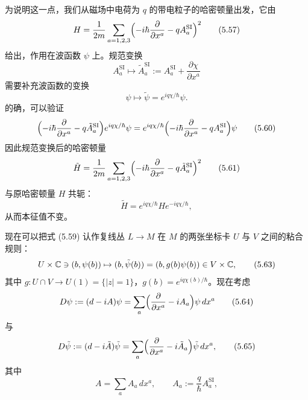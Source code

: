 为说明这一点，我们从磁场中电荷为 $q$ 的带电粒子的哈密顿量出发，它由
\begin{equation}
  H=\frac{1}{2m}\sum_{a=1,2,3}\Bigl(-i\hbar\frac{\partial}{\partial x^a}-qA^{\mathrm{SI}}_a\Bigr)^2
  \tag{5.57}
\end{equation}
给出，作用在波函数 $\psi$ 上。规范变换
\begin{equation}
  A^{\mathrm{SI}}_a\mapsto\tilde A^{\mathrm{SI}}_a:=A^{\mathrm{SI}}_a+\frac{\partial\chi}{\partial x^a}
  \tag{5.58}
\end{equation}
需要补充波函数的变换
\begin{equation}
  \psi\mapsto\tilde\psi=e^{iq\chi/\hbar}\psi.
  \tag{5.59}
\end{equation}
的确，可以验证
\begin{equation}
  \Bigl(-i\hbar\frac{\partial}{\partial x^a}-q\tilde A^{\mathrm{SI}}_a\Bigr)e^{iq\chi/\hbar}\psi
  =e^{iq\chi/\hbar}\Bigl(-i\hbar\frac{\partial}{\partial x^a}-qA^{\mathrm{SI}}_a\Bigr)\psi
  \tag{5.60}
\end{equation}
因此规范变换后的哈密顿量
\begin{equation}
  \tilde H=\frac{1}{2m}\sum_{a=1,2,3}\Bigl(-i\hbar\frac{\partial}{\partial x^a}-q\tilde A^{\mathrm{SI}}_a\Bigr)^2
  \tag{5.61}
\end{equation}
与原哈密顿量 $H$ 共轭：
\begin{equation}
  \tilde H=e^{iq\chi/\hbar}He^{-iq\chi/\hbar},
  \tag{5.62}
\end{equation}
从而本征值不变。

现在可以把式 (5.59) 认作复线丛 $L\to M$ 在 $M$ 的两张坐标卡 $U$ 与 $V$ 之间的粘合规则：
\begin{equation}
  U\times\mathbb{C}\ni(b,\psi(b))\mapsto(b,\tilde\psi(b))=(b,g(b)\psi(b))\in V\times\mathbb{C},
  \tag{5.63}
\end{equation}
其中 $g:U\cap V\to U(1)=\{|z|=1\}$，$g(b)=e^{iq\chi(b)/\hbar}$。现在考虑
\begin{equation}
  D\psi:=(d-iA)\psi=\sum_a\Bigl(\frac{\partial}{\partial x^a}-iA_a\Bigr)\psi\,dx^a
  \tag{5.64}
\end{equation}
与
\begin{equation}
  D\tilde\psi:=(d-i\tilde A)\tilde\psi=\sum_a\Bigl(\frac{\partial}{\partial x^a}-i\tilde A_a\Bigr)\tilde\psi\,dx^a,
  \tag{5.65}
\end{equation}
其中
\begin{equation}
  A=\sum_aA_a\,dx^a,\qquad A_a:=\frac{q}{\hbar}A^{\mathrm{SI}}_a,
  \tag{5.66}
\end{equation}

